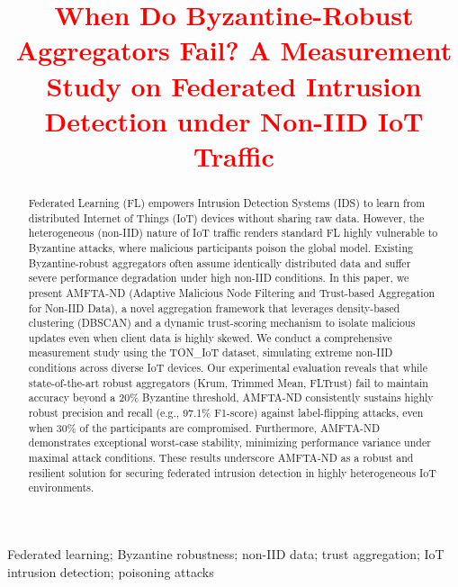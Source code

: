 \documentclass[]{interact}
\begin{document}

\title{\textcolor{red}{When Do Byzantine-Robust Aggregators Fail? A Measurement Study on Federated Intrusion Detection under Non-IID IoT Traffic}}

\author{
}

\maketitle

\begin{abstract}
\color{blue}
Federated Learning (FL) empowers Intrusion Detection Systems (IDS) to learn from distributed Internet of Things (IoT) devices without sharing raw data. However, the heterogeneous (non-IID) nature of IoT traffic renders standard FL highly vulnerable to Byzantine attacks, where malicious participants poison the global model. Existing Byzantine-robust aggregators often assume identically distributed data and suffer severe performance degradation under high non-IID conditions. In this paper, we present AMFTA-ND (Adaptive Malicious Node Filtering and Trust-based Aggregation for Non-IID Data), a novel aggregation framework that leverages density-based clustering (DBSCAN) and a dynamic trust-scoring mechanism to isolate malicious updates even when client data is highly skewed. We conduct a comprehensive measurement study using the TON\_IoT dataset, simulating extreme non-IID conditions across diverse IoT devices. Our experimental evaluation reveals that while state-of-the-art robust aggregators (Krum, Trimmed Mean, FLTrust) fail to maintain accuracy beyond a 20\% Byzantine threshold, AMFTA-ND consistently sustains highly robust precision and recall (e.g., 97.1\% F1-score) against label-flipping attacks, even when 30\% of the participants are compromised. Furthermore, AMFTA-ND demonstrates exceptional worst-case stability, minimizing performance variance under maximal attack conditions. These results underscore AMFTA-ND as a robust and resilient solution for securing federated intrusion detection in highly heterogeneous IoT environments.
\end{abstract}

\begin{keywords}
Federated learning; Byzantine robustness; non-IID data; trust aggregation;
IoT intrusion detection; poisoning attacks
\end{keywords}
\end{document}
